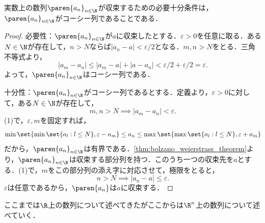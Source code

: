 \documentclass[a4paper,10pt]{ltjsarticle}
\begin{document}
\begin{MyTheorem}
  実数上の数列\(\paren{a_n}_{n\in\N}\)が収束するための必要十分条件は，\(\paren{a_n}_{n\in\N}\)がコーシー列であることである．
\end{MyTheorem}
\begin{proof}
  必要性：\(\paren{a_n}_{n\in\N}\)が\(a\)に収束したとする．\(\varepsilon > 0\)を任意に取る．ある\(N \in \N\)が存在して，\(n > N\)ならば\(|a_n - a| < \varepsilon/2\)となる．\(m, n > N\)をとる．三角不等式より，
  \[ |a_m - a_n| \le |a_m - a| + |a - a_n| < \varepsilon/2 + \varepsilon/2 = \varepsilon. \]
  よって，\(\paren{a_n}_{n\in\N}\)はコーシー列である．

  十分性：\(\paren{a_n}_{n\in\N}\)がコーシー列であるとする．定義より，\(\varepsilon > 0\)に対して，ある\(N \in \N\)が存在して，
  \[ m, n > N \implies |a_m - a_n| < \varepsilon. \tag{1}\]
  (1)で，\(\varepsilon, m\)を固定すれば，
  \[ \min\set{\min\set{a_l: l\le N}, \varepsilon - a_m} \le a_n \le \max\set{\max\set{a_l: l\le N}, \varepsilon + a_m} \]
  だから，\(\paren{a_n}_{n\in\N}\)は有界である．\cref{thm:bolzano_weierstrass_theorem}より，\(\paren{a_n}_{n\in\N}\)は収束する部分列を持つ．このうち一つの収束先を\(a\)とする．(1)で，\(m\)をこの部分列の添え字に対応させて，極限をとると，
  \[ n > N \implies |a_n - a| \le \varepsilon. \]
  \(\varepsilon\)は任意であるから，\(\paren{a_n}\)は\(a\)に収束する．
\end{proof}

ここまでは\(\R\)上の数列について述べてきたがここからは\(\R^n\)上の数列について述べていく．
\end{document}
